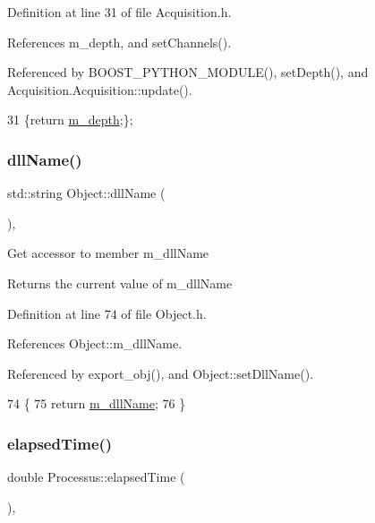 Definition at line 31 of file Acquisition.\+h.



References m\+\_\+depth, and set\+Channels().



Referenced by B\+O\+O\+S\+T\+\_\+\+P\+Y\+T\+H\+O\+N\+\_\+\+M\+O\+D\+U\+L\+E(), set\+Depth(), and Acquisition.\+Acquisition\+::update().


\begin{DoxyCode}
31 \{\textcolor{keywordflow}{return} \hyperlink{classAcquisition_a26628424533a2dd74d24712a14637a72}{m\_depth};\};
\end{DoxyCode}
\mbox{\label{classObject_a2e3947f2870094c332d7454117f3ec63}} 
\subsubsection{\texorpdfstring{dll\+Name()}{dllName()}}
{\footnotesize\ttfamily std\+::string Object\+::dll\+Name (\begin{DoxyParamCaption}{ }\end{DoxyParamCaption})\hspace{0.3cm}{\ttfamily [inline]}, {\ttfamily [inherited]}}

Get accessor to member m\+\_\+dll\+Name \begin{DoxyReturn}{Returns}
the current value of m\+\_\+dll\+Name 
\end{DoxyReturn}


Definition at line 74 of file Object.\+h.



References Object\+::m\+\_\+dll\+Name.



Referenced by export\+\_\+obj(), and Object\+::set\+Dll\+Name().


\begin{DoxyCode}
74                        \{
75     \textcolor{keywordflow}{return} \hyperlink{classObject_a01afbeacebb8db6831559972ec362eb3}{m\_dllName};
76   \}  
\end{DoxyCode}
\mbox{\label{classProcessus_aecca96218c65bc805c988cd95447df55}} 
\subsubsection{\texorpdfstring{elapsed\+Time()}{elapsedTime()}\hspace{0.1cm}{\footnotesize\ttfamily [1/2]}}
{\footnotesize\ttfamily double Processus\+::elapsed\+Time (\begin{DoxyParamCaption}{ }\end{DoxyParamCaption})\hspace{0.3cm}{\ttfamily [inline]}, {\ttfamily [inherited]}}



